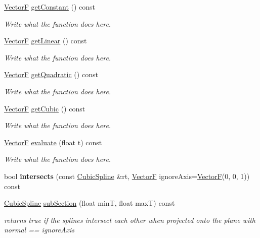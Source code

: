 \begin{DoxyCompactItemize}
\item 
\hyperlink{structVectorF}{Vector\+F} \hyperlink{structCubicSpline_a87a1c29ab58b648430f45668067d7a1c}{get\+Constant} () const 
\begin{DoxyCompactList}\small\item\em Write what the function does here. \end{DoxyCompactList}\item 
\hyperlink{structVectorF}{Vector\+F} \hyperlink{structCubicSpline_ada872ef617b059ef68490e828bcdf181}{get\+Linear} () const 
\begin{DoxyCompactList}\small\item\em Write what the function does here. \end{DoxyCompactList}\item 
\hyperlink{structVectorF}{Vector\+F} \hyperlink{structCubicSpline_a7d5792ff1314032122cd342d0616a50f}{get\+Quadratic} () const 
\begin{DoxyCompactList}\small\item\em Write what the function does here. \end{DoxyCompactList}\item 
\hyperlink{structVectorF}{Vector\+F} \hyperlink{structCubicSpline_a156525e59dae0cac2a81cf34cb673c87}{get\+Cubic} () const 
\begin{DoxyCompactList}\small\item\em Write what the function does here. \end{DoxyCompactList}\item 
\hyperlink{structVectorF}{Vector\+F} \hyperlink{structCubicSpline_a6b5d7cf704ce35a9bce93d6faf53a4fe}{evaluate} (float t) const 
\begin{DoxyCompactList}\small\item\em Write what the function does here. \end{DoxyCompactList}\item 
\hypertarget{structCubicSpline_a17f53f7cb9b49caa80eff66097b57145}{bool {\bfseries intersects} (const \hyperlink{structCubicSpline}{Cubic\+Spline} \&rt, \hyperlink{structVectorF}{Vector\+F} ignore\+Axis=\hyperlink{structVectorF}{Vector\+F}(0, 0, 1)) const }\label{structCubicSpline_a17f53f7cb9b49caa80eff66097b57145}

\item 
\hyperlink{structCubicSpline}{Cubic\+Spline} \hyperlink{structCubicSpline_a9af4ede47352f7d8d38b520632b2bf3d}{sub\+Section} (float min\+T, float max\+T) const 
\begin{DoxyCompactList}\small\item\em returns true if the splines intersect each other when projected onto the plane with normal == ignore\+Axis \end{DoxyCompactList}\end{DoxyCompactItemize}
